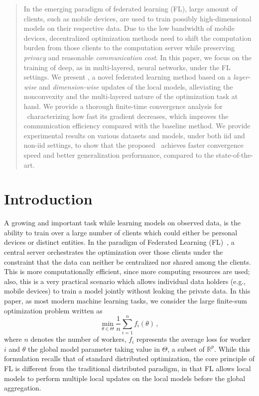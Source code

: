 \documentclass[nohyperref]{article}
\begin{document}
\begin{abstract}
In the emerging paradigm of federated learning (FL), large amount of clients, such as mobile devices, are used to train possibly high-dimensional models on their respective data.
Due to the low bandwidth of mobile devices, decentralized optimization methods need to shift the computation burden from those clients to the computation server while preserving \emph{privacy} and reasonable \emph{communication cost}.
In this paper, we focus on the training of deep, as in multi-layered, neural networks, under the FL settings.
We present \algo, a novel federated learning method based on a \emph{layer-wise} and \emph{dimension-wise} updates of the local models, alleviating the nonconvexity and the multi-layered nature of the optimization task at hand.
We provide a thorough finite-time convergence analysis for \algo\ characterizing how fast its gradient decreases, which improves the communication efficiency compared with the baseline method. We provide experimental results on various datasets and models, under both iid and non-iid settings, to show that the proposed \algo\ achieves faster convergence speed and better generalization performance, compared to the state-of-the-art.
\end{abstract}



\section{Introduction}\label{sec:introduction}

A growing and important task while learning models on observed data, is the ability to train over a large number of clients which could either be personal devices or distinct entities.
In the paradigm of Federated Learning (FL)~\citep{konevcny2016federated,mcmahan2017communication}, a central server orchestrates the optimization over those clients under the constraint that the data can neither be centralized nor shared among the clients.
This is more computationally efficient, since more computing resources are used; also, this is a very practical scenario which allows individual data holders (e.g., mobile devices) to train a model jointly without leaking the private data. In this paper, as most modern machine learning tasks, we consider the large finite-sum optimization problem written as
\begin{equation}\label{eq:opt}
\min \limits_{\theta \in \Theta} \frac{1}{n} \sum_{i=1}^n f_i(\theta) \, ,
\end{equation}
where $n$ denotes the number of workers, $f_i$ represents the average loss for worker $i$ and $\theta$ the global model parameter taking value in $\Theta$, a subset of $\mathbb{R}^p$.
While this formulation recalls that of standard distributed optimization, the core principle of FL is different from the traditional distributed paradigm, in that FL allows local models to perform multiple local updates on the local models before the global aggregation.
\end{document}
